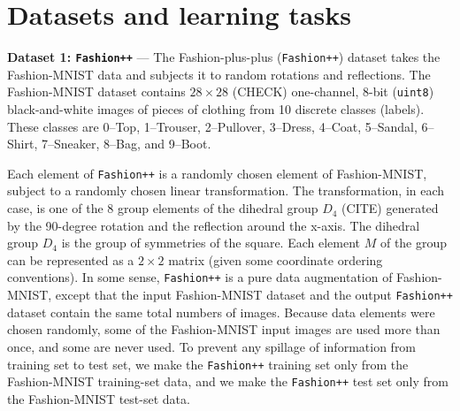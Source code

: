 \documentclass{article}
\renewcommand{\paragraph}[1]{\par\medskip\noindent\textbf{#1} ---}
\begin{document}
\section{Datasets and learning tasks}

\paragraph{Dataset 1: \texttt{Fashion++}}
The Fashion-plus-plus (\texttt{Fashion++}) dataset takes the Fashion-MNIST data \cite{fashion} and subjects it to random rotations and reflections.
The Fashion-MNIST dataset contains $28\times 28$ (CHECK) one-channel, 8-bit (\texttt{uint8}) black-and-white images of pieces of clothing from 10 discrete classes (labels).
These classes are 0--Top, 1--Trouser, 2--Pullover, 3--Dress, 4--Coat, 5--Sandal, 6--Shirt, 7--Sneaker, 8--Bag, and 9--Boot.

Each element of \texttt{Fashion++} is a randomly chosen element of Fashion-MNIST, subject to a randomly chosen linear transformation.
The transformation, in each case, is one of the 8 group elements of the dihedral group $D_4$ (CITE) generated by the 90-degree rotation and the reflection around the x-axis.
The dihedral group $D_4$ is the group of symmetries of the square.
Each element $M$ of the group can be represented as a $2\times 2$ matrix (given some coordinate ordering conventions).
In some sense, \texttt{Fashion++} is a pure data augmentation of Fashion-MNIST, except that the input Fashion-MNIST dataset and the output \texttt{Fashion++} dataset contain the same total numbers of images.
Because data elements were chosen randomly, some of the Fashion-MNIST input images are used more than once, and some are never used.
To prevent any spillage of information from training set to test set, we make the \texttt{Fashion++} training set only from the Fashion-MNIST training-set data, and we make the \texttt{Fashion++} test set only from the Fashion-MNIST test-set data. 
\end{document}
